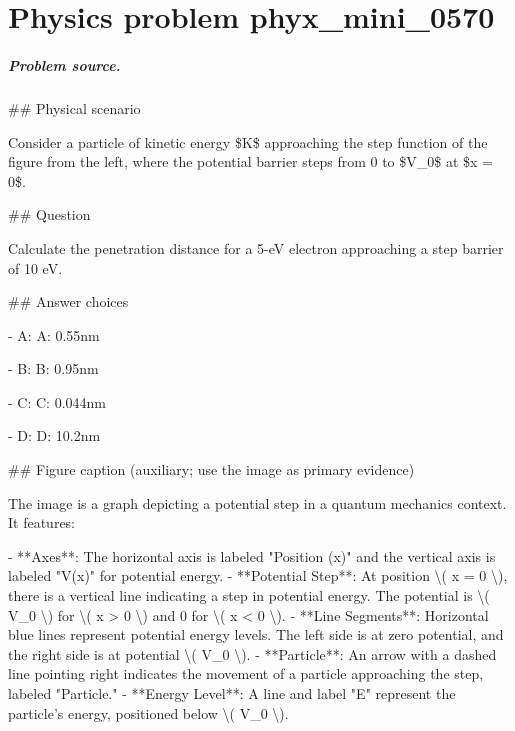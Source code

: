 
\chapter{Physics problem phyx\_mini\_0570}
\label{ch:PhyXMiniProblems_problem_phyx_mini_0570}

\paragraph{Problem source.}
\#\# Physical scenario

Consider a particle of kinetic energy \$K\$ approaching the step function of the figure from the left, where the potential barrier steps from 0 to \$V\_0\$ at \$x = 0\$.

\#\# Question

Calculate the penetration distance for a 5-eV electron approaching a step barrier of 10 eV.

\#\# Answer choices

- A: A: 0.55nm

- B: B: 0.95nm

- C: C: 0.044nm

- D: D: 10.2nm

\#\# Figure caption (auxiliary; use the image as primary evidence)

The image is a graph depicting a potential step in a quantum mechanics context. It features:

- **Axes**: The horizontal axis is labeled "Position (x)" and the vertical axis is labeled "V(x)" for potential energy.
- **Potential Step**: At position \textbackslash{}( x = 0 \textbackslash{}), there is a vertical line indicating a step in potential energy. The potential is \textbackslash{}( V\_0 \textbackslash{}) for \textbackslash{}( x > 0 \textbackslash{}) and 0 for \textbackslash{}( x < 0 \textbackslash{}).
- **Line Segments**: Horizontal blue lines represent potential energy levels. The left side is at zero potential, and the right side is at potential \textbackslash{}( V\_0 \textbackslash{}).
- **Particle**: An arrow with a dashed line pointing right indicates the movement of a particle approaching the step, labeled "Particle."
- **Energy Level**: A line and label "E" represent the particle's energy, positioned below \textbackslash{}( V\_0 \textbackslash{}).
  
